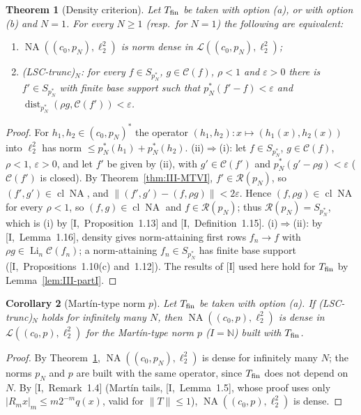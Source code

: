 \documentclass[10pt]{amsart}
\newtheorem{theorem}{Theorem}[section]
\newtheorem{corollary}[theorem]{Corollary}
\theoremstyle{definition}
\theoremstyle{remark}
\newcommand{\NA}{\operatorname{NA}}
\newcommand{\dist}{\operatorname{dist}}
\newcommand{\N}{\mathbb N}
\newcommand{\Cset}{\mathcal C}
\newcommand{\Li}{\operatorname*{Li}}
\newcommand{\cl}{\operatorname{cl}}
\newcommand{\Rec}{\mathcal R}
\begin{document}
\begin{theorem}[Density criterion]\label{thm:III-VI2}
Let $T_{\rm fin}$ be taken with option \textup{(a)}, or with option \textup{(b)} and
$N=1$.  For every $N\ge1$ \textup{(}resp.\ for $N=1$\textup{)} the following are
equivalent:
\begin{enumerate}
\item[(i)] $\NA((c_0,p_N),\ell_2^2)$ is norm dense in $\mathcal L((c_0,p_N),\ell_2^2)$;
\item[(ii)] \textup{(LSC-trunc)$_N$}: for every $f\in S_{p_N^*}$, $g\in\Cset(f)$,
$\rho<1$ and $\varepsilon>0$ there is $f'\in S_{p_N^*}$ with finite base support
such that $p_N^*(f'-f)<\varepsilon$ and $\dist_{p_N^*}(\rho g,\Cset(f'))<
\varepsilon$.
\end{enumerate}
\end{theorem}

\begin{proof}
For $h_1,h_2\in(c_0,p_N)^*$ the operator $(h_1,h_2):x\mapsto(h_1(x),h_2(x))$ into
$\ell_2^2$ has norm $\le p_N^*(h_1)+p_N^*(h_2)$.
(ii)$\Rightarrow$(i): let $f\in S_{p_N^*}$, $g\in\Cset(f)$, $\rho<1$, $\varepsilon>0$,
and let $f'$ be given by (ii), with $g'\in\Cset(f')$ and $p_N^*(g'-\rho g)<\varepsilon$
($\Cset(f')$ is closed).  By Theorem~\ref{thm:III-MTVI}, $f'\in\Rec(p_N)$, so
$(f',g')\in\cl\NA$, and $\|(f',g')-(f,\rho g)\|<2\varepsilon$.  Hence $(f,\rho g)\in
\cl\NA$ for every $\rho<1$, so $(f,g)\in\cl\NA$ and $f\in\Rec(p_N)$; thus
$\Rec(p_N)=S_{p_N^*}$, which is (i) by [I,~Proposition~1.13] and
[I,~Definition~1.15].
(i)$\Rightarrow$(ii): by [I,~Lemma~1.16], density gives norm-attaining first rows
$f_n\to f$ with $\rho g\in\Li_n\Cset(f_n)$; a norm-attaining $f_n\in S_{p_N^*}$ has
finite base support ([I,~Propositions~1.10(c) and~1.12]).
The results of [I] used here hold for $T_{\rm fin}$ by Lemma~\ref{lem:III-partI}.
\end{proof}

\begin{corollary}[Mart\'in-type norm $p$]\label{cor:III-VI3}
Let $T_{\rm fin}$ be taken with option \textup{(a)}.  If \textup{(LSC-trunc)$_N$}
holds for infinitely many $N$, then $\NA((c_0,p),\ell_2^2)$ is dense in
$\mathcal L((c_0,p),\ell_2^2)$ for the Mart\'in-type norm $p$ \textup{(}$I=\N$\textup{)}
built with $T_{\rm fin}$.
\end{corollary}

\begin{proof}
By Theorem~\ref{thm:III-VI2}, $\NA((c_0,p_N),\ell_2^2)$ is dense for infinitely many
$N$; the norms $p_N$ and $p$ are built with the same operator, since $T_{\rm fin}$
does not depend on $N$.  By [I,~Remark~1.4] (Mart\'in tails, [I,~Lemma~1.5],
whose proof uses only $|R_mx|_m\le m2^{-m}q(x)$, valid for $\|T\|\le1$),
$\NA((c_0,p),\ell_2^2)$ is dense.
\end{proof}
\end{document}
